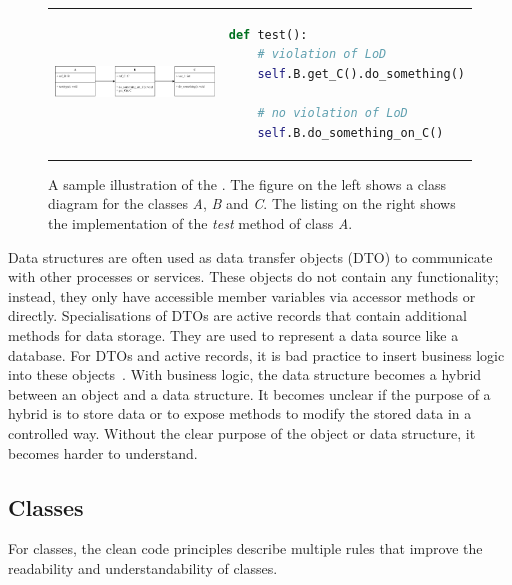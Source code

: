 \begin{figure}
\begin{tabular}{p{}p{}}
    \begin{minipage}{0.45\textwidth}
        \centering
    \includegraphics[width=\linewidth]{img/Background/LawOfDemeterUML.pdf}
    \label{fig:background_control_flow_graph_image}
    \end{minipage}
&
\begin{minipage}[c]{0.45\textwidth}
\centering
\begin{lstlisting}[language=Python, label=lst:background_control_flow_graph_listing]
def test():
    # violation of LoD
    self.B.get_C().do_something()

    # no violation of LoD
    self.B.do_something_on_C()
\end{lstlisting}
\end{minipage}
\end{tabular}
\caption{A sample illustration of the . The figure on the left shows a class diagram for the classes \textit{A}, \textit{B} and \textit{C}. The listing on the right shows the implementation of the \textit{test} method of class \textit{A}. }
\label{fig:LoD}
\end{figure}



Data structures are often used as data transfer objects (DTO) to communicate with other processes or services. These objects do not contain any functionality; instead, they only have accessible member variables via accessor methods or directly. Specialisations of DTOs are active records that contain additional methods for data storage. They are used to represent a data source like a database. For DTOs and active records, it is bad practice to insert business logic into these objects~\cite{martin_clean_2009}. With business logic, the data structure becomes a hybrid between an object and a data structure. It becomes unclear if the purpose of a hybrid is to store data or to expose methods to modify the stored data in a controlled way. Without the clear purpose of the object or data structure, it becomes harder to understand.


\subsection{Classes}\label{sec:classes}
For classes, the clean code principles describe multiple rules that improve the readability and understandability of classes.

